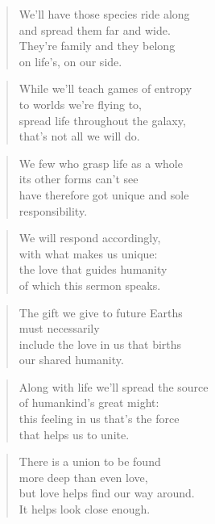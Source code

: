 \documentclass[10pt,a4paper]{article}
\begin{document}
\begin{paracol}{2}
\begin{verse}
We’ll have those species ride along\\
and spread them far and wide.\\
They’re family and they belong\\
on life’s, on our side.
\end{verse}

\begin{verse}
While we’ll teach games of entropy\\
to worlds we’re flying to,\\
spread life throughout the galaxy,\\
that’s not all we will do.
\end{verse}

\begin{verse}
We few who grasp life as a whole\\
its other forms can’t see\\
have therefore got unique and sole\\
responsibility.
\end{verse}

\begin{verse}
We will respond accordingly,\\
with what makes us unique:\\
the love that guides humanity\\
of which this sermon speaks.\\
\end{verse}

\begin{verse}
The gift we give to future Earths\\
must necessarily\\
include the love in us that births\\
our shared humanity.
\end{verse}

\begin{verse}
Along with life we’ll spread the source\\
of humankind’s great might:\\
this feeling in us that’s the force\\
that helps us to unite.
\end{verse}

\begin{verse}
There is a union to be found\\
more deep than even love,\\
but love helps find our way around.\\
It helps look close enough.
\end{verse}


\end{paracol}
\end{document}
